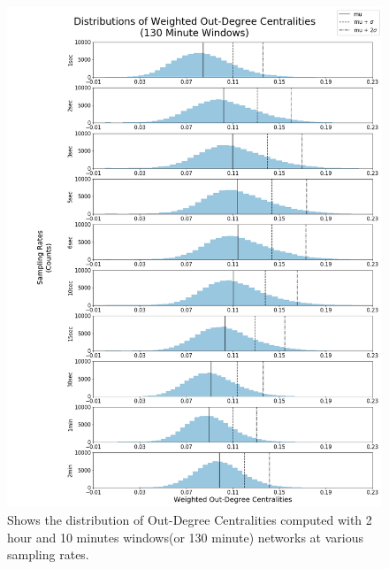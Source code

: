 \begin{figure}[!htb]
  \centerline{\includegraphics[scale=0.42]{figures/PredIF/130MinDist-OutDeg.png}}
  \caption{Shows the distribution of Out-Degree Centralities computed with 2 hour and 10 minutes  windows(or 130 minute) networks at various sampling rates.}
  \label{fig:130MinDist-OutDeg}
\end{figure}

